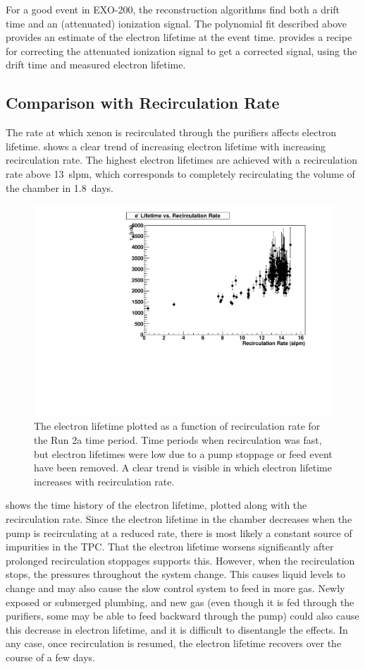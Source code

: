 \documentclass[herrin-thesis.tex]{subfiles}
\begin{document}
For a good event in EXO-200, the reconstruction algorithms find both a drift time and an (attenuated) ionization signal. The polynomial fit described above provides an estimate of the electron lifetime at the event time.  provides a recipe for correcting the attenuated ionization signal to get a corrected signal, using the drift time and measured electron lifetime.

\subsection{Comparison with Recirculation Rate}
The rate at which xenon is recirculated through the purifiers affects electron lifetime.  shows a clear trend of increasing electron lifetime with increasing recirculation rate. The highest electron lifetimes are achieved with a recirculation rate above \SI{13}{slpm}, which corresponds to completely recirculating the volume of the chamber in \SI{1.8}{days}.

\begin{figure}[tbp]
\centering
\includegraphics[width=0.6\columnwidth]{./plots/el_vs_recirculation.pdf}
\caption[Electron lifetime vs. recirculation rate]{The electron lifetime plotted as a function of recirculation rate for the Run 2a time period. Time periods when recirculation was fast, but electron lifetimes were low due to a pump stoppage or feed event have been removed. A clear trend is visible in which electron lifetime increases with recirculation rate.}
\label{fig:el_vs_recirculation}
\end{figure}

 shows the time history of the electron lifetime, plotted along with the recirculation rate. Since the electron lifetime in the chamber decreases when the pump is recirculating at a reduced rate, there is most likely a constant source of impurities in the TPC. That the electron lifetime worsens significantly after prolonged recirculation stoppages supports this. However, when the recirculation stops, the pressures throughout the system change. This causes liquid levels to change and may also cause the slow control system to feed in more gas. Newly exposed or submerged plumbing, and new gas (even though it is fed through the purifiers, some may be able to feed backward through the pump) could also cause this decrease in electron lifetime, and it is difficult to disentangle the effects. In any case, once recirculation is resumed, the electron lifetime recovers over the course of a few days.
\end{document}
